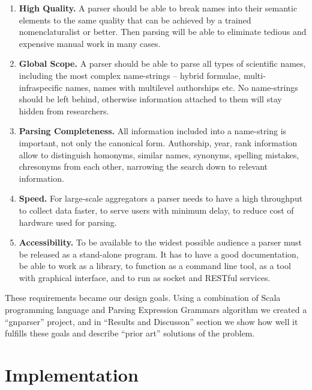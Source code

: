\documentclass{bmcart}
\begin{document}
\begin{enumerate}

  \item \textbf{High Quality.} A parser should be able to break names into their
    semantic elements to the same quality that can be achieved by a trained
    nomenclaturalist or better. Then parsing will be able to eliminate tedious
    and expensive manual work in many cases.

  \item \textbf{Global Scope.} A parser should be able to parse all types of
    scientific names, including the most complex name-strings -- hybrid
    formulae, multi-infraspecific names, names with multilevel authorships etc.
    No name-strings should be left behind, otherwise information attached to
    them will stay hidden from researchers.

  \item \textbf{Parsing Completeness.} All information included into a
    name-string is important, not only the canonical form. Authorship, year,
    rank information allow to distinguish homonyms, similar names, synonyms,
    spelling mistakes, chresonyms from each other, narrowing the search down to
    relevant information.

  \item \textbf{Speed.} For large-scale aggregators a parser needs to have a
    high throughput to collect data faster, to serve users with minimum delay,
    to reduce cost of hardware used for parsing.

  \item \textbf{Accessibility.} To be available to the widest possible audience
    a parser must be released as a stand-alone program. It has to have a
    good documentation, be able to work as a library, to function as a command
    line tool, as a tool with graphical interface, and to run as socket and
    RESTful services.

\end{enumerate}

These requirements became our design goals. Using a combination of Scala
programming language and Parsing Expression Grammars algorithm we created a
``gnparser'' project, and in ``Results and Discusson'' section we show how well
it fulfills these goals and describe ``prior art'' solutions of the problem.

\section*{Implementation}
\end{document}
